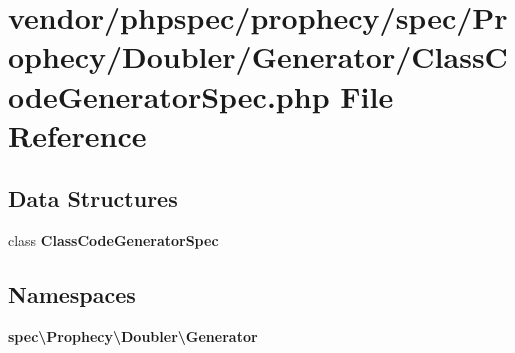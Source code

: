 \section{vendor/phpspec/prophecy/spec/\+Prophecy/\+Doubler/\+Generator/\+Class\+Code\+Generator\+Spec.php File Reference}
\label{_class_code_generator_spec_8php}
\subsection*{Data Structures}
\begin{DoxyCompactItemize}
\item 
class {\bf Class\+Code\+Generator\+Spec}
\end{DoxyCompactItemize}
\subsection*{Namespaces}
\begin{DoxyCompactItemize}
\item 
 {\bf spec\textbackslash{}\+Prophecy\textbackslash{}\+Doubler\textbackslash{}\+Generator}
\end{DoxyCompactItemize}
